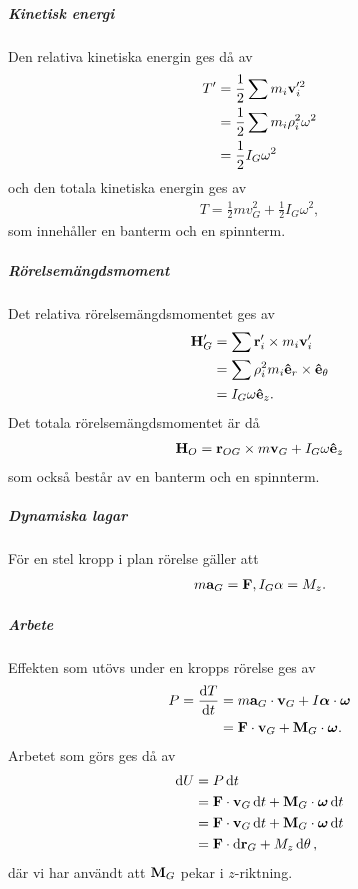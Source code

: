 \subparagraph{Kinetisk energi}
Den relativa kinetiska energin ges då av
\begin{align*}
	T' &= \frac{1}{2}\sum m_{i}\vb{v}_{i}'^{2} \\
	   &= \frac{1}{2}\sum m_{i}\rho_{i}^{2}\omega^{2} \\
	   &= \frac{1}{2}I_{G}\omega^{2}
\end{align*}
och den totala kinetiska energin ges av
\begin{align*}
	T = \frac{1}{2}mv_{G}^{2} + \frac{1}{2}I_{G}\omega^{2},
\end{align*}
som innehåller en banterm och en spinnterm.

\subparagraph{Rörelsemängdsmoment}
Det relativa rörelsemängdsmomentet ges av
\begin{align*}
	\vb{H}_{G}' &= \sum \vb{r}_{i}'\times m_{i}\vb{v}_{i}' \\
	            &= \sum \rho_{i}^{2} m_{i}\vu{e}_{r}\times\vu{e}_{\theta} \\
	            &= I_{G}\omega\vu{e}_{z}.
\end{align*}
Det totala rörelsemängdsmomentet är då
\begin{align*}
	\vb{H}_{O} = \vb{r}_{OG}\times m\vb{v}_{G} + I_{G}\omega\vu{e}_{z}
\end{align*}
som också består av en banterm och en spinnterm.

\subparagraph{Dynamiska lagar}
För en stel kropp i plan rörelse gäller att
\begin{align*}
	m\vb{a}_{G} = \vb{F}, I_{G}\alpha = M_{z}.
\end{align*}

\subparagraph{Arbete}
Effekten som utövs under en kropps rörelse ges av
\begin{align*}
	P = \dv{T}{t} &= m\vb{a}_{G}\cdot\vb{v}_{G} + I\vb*{\alpha}\cdot\vb*{\omega} \\
	              &= \vb{F}\cdot\vb{v}_{G} + \vb{M}_{G}\cdot\vb*{\omega}.
\end{align*}
Arbetet som görs ges då av
\begin{align*}
	\dd{U} &= P\dd{t} \\
	       &= \vb{F}\cdot\vb{v}_{G}\dd{t} + \vb{M}_{G}\cdot\vb*{\omega}\dd{t} \\
	       &= \vb{F}\cdot\vb{v}_{G}\dd{t} + \vb{M}_{G}\cdot\vb*{\omega}\dd{t} \\
	       &= \vb{F}\cdot\dd{\vb{r}_{G}} + M_{z}\dd{\theta},
\end{align*}
där vi har användt att $\vb{M}_{G}$ pekar i $z$-riktning.